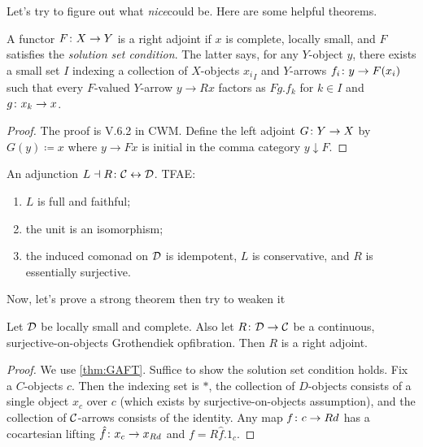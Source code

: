\documentclass{amsart}
\newcommand{\nice}{\emph{nice}}
\begin{document}
Let's try to figure out what \nice could be. Here are some helpful theorems.

\begin{thm}
\label{thm:GAFT}
	A functor $ F \colon X \to Y $ is a right adjoint if  $ x $ is complete, locally small, and $ F $ satisfies the \emph{solution set condition}. The latter says, for any $ Y $-object $ y $, there exists a small set $ I $ indexing a collection of $ X $-objects $ {x_i}_I $ and $ Y $-arrows $ {f_i \colon y \to F ( x_i ) } $ such that every $ F $-valued $ Y $-arrow $ y \to R x $ factors as $ Fg . f_k $ for $ k \in I $ and $ g \colon x_k \to x $.
\end{thm}

\begin{proof}
	The proof is V.6.2 in CWM.  Define the left adjoint $ G \colon Y \to X $ by $ G (y) \coloneqq x $ where $ y \to F x $ is initial in the comma category $ y \downarrow F $.  
\end{proof}

\begin{thm}
\label{thm:GabZis}
	An adjunction $ L \dashv R \colon \mathcal{C} \leftrightarrow \mathcal{D} $. TFAE:
	\begin{enumerate}
		\item $ L $ is full and faithful;
		\item the unit is an isomorphism;
		\item the induced comonad on $ \mathcal{D} $ is idempotent, $ L $ is conservative, and $ R $ is essentially surjective.
	\end{enumerate}
\end{thm}

Now, let's prove a strong theorem then try to weaken it

\begin{thm}
	Let $ \mathcal{D}$ be locally small and complete. Also let $ R \colon \mathcal{D} \to \mathcal{C} $ be a continuous, surjective-on-objects Grothendiek opfibration.  Then $ R $ is a right adjoint.
\end{thm}

\begin{proof}
	We use \ref{thm:GAFT}.  Suffice to show the solution set condition holds.  Fix a $ C $-objects $ c $.  Then the indexing set is $ \ast $, the collection of $ D $-objects consists of a single object $ x_c $ over $ c $ (which exists by surjective-on-objects assumption), and the collection of $ \mathcal{C} $-arrows consists of the identity.  Any map $ f \colon c \to Rd $ has a cocartesian lifting $ \hat{f} \colon x_c \to x_{Rd} $ and $ f = R \hat{f} . 1_c $.
\end{proof}
\end{document}

